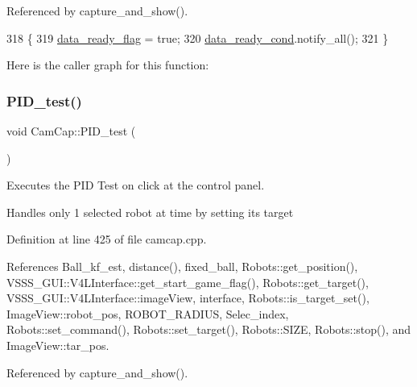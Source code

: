 Referenced by capture\+\_\+and\+\_\+show().


\begin{DoxyCode}
318                                \{
319     \hyperlink{class_cam_cap_a6ebbdd1217a68d77959aec45c7ea59e2}{data\_ready\_flag} = \textcolor{keyword}{true};
320     \hyperlink{class_cam_cap_a609ffa71782939a4428485a191202bbc}{data\_ready\_cond}.notify\_all();
321 \}
\end{DoxyCode}
Here is the caller graph for this function\+:
\mbox{\label{class_cam_cap_a93f8ee79ed618c215139e40eb0485c9f}} 
\subsubsection{\texorpdfstring{P\+I\+D\+\_\+test()}{PID\_test()}}
{\footnotesize\ttfamily void Cam\+Cap\+::\+P\+I\+D\+\_\+test (\begin{DoxyParamCaption}{ }\end{DoxyParamCaption})}



Executes the \textquotesingle{}P\+ID Test on click\textquotesingle{} at the control panel. 

Handles only 1 selected robot at time by setting it\textquotesingle{}s target 

Definition at line 425 of file camcap.\+cpp.



References Ball\+\_\+kf\+\_\+est, distance(), fixed\+\_\+ball, Robots\+::get\+\_\+position(), V\+S\+S\+S\+\_\+\+G\+U\+I\+::\+V4\+L\+Interface\+::get\+\_\+start\+\_\+game\+\_\+flag(), Robots\+::get\+\_\+target(), V\+S\+S\+S\+\_\+\+G\+U\+I\+::\+V4\+L\+Interface\+::image\+View, interface, Robots\+::is\+\_\+target\+\_\+set(), Image\+View\+::robot\+\_\+pos, R\+O\+B\+O\+T\+\_\+\+R\+A\+D\+I\+US, Selec\+\_\+index, Robots\+::set\+\_\+command(), Robots\+::set\+\_\+target(), Robots\+::\+S\+I\+ZE, Robots\+::stop(), and Image\+View\+::tar\+\_\+pos.



Referenced by capture\+\_\+and\+\_\+show().


